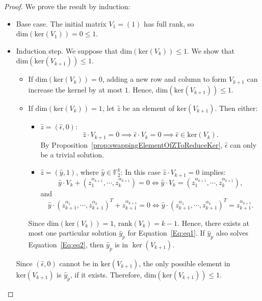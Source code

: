 \documentclass[11pt]{llncs}
\begin{document}
\begin{proof}
    We prove the result by induction:
    \begin{itemize}
        \item Base case. The initial matrix $V_1 = (1)$ has full rank, so $\text{dim}( \text{ker}(V_1)) = 0 \leq 1$.
        \item Induction step. We suppose that $\text{dim}( \text{ker}(V_k))\le 1$. We show that $\text{dim}( \text{ker}(V_{k+1}))\le 1$.
        \begin{itemize}
            \item If $\text{dim}( \text{ker}(V_k))= 0$, adding a new row and column to form $V_{k+1}$ can increase the kernel by at most $1$. Hence, $\text{dim}( \text{ker}(V_{k+1}))\le 1$.
            \item            
            If $\text{dim}( \text{ker}(V_k))= 1$, let $\hat{z}$ be an element of $\text{ker}\left(V_{k+1}\right)$. 
            Then either:
            \begin{itemize}
            	\item  \( \hat{z} = (\hat{\epsilon}, 0) \):  
\[
\hat{z} \cdot V_{k+1} = 0 \implies \hat{\epsilon} \cdot V_k = 0 \implies \hat{\epsilon} \in \text{ker}(V_k).
\]
By Proposition~\ref{prop:swappingElementOfZToReduceKer}, \( \hat{\epsilon} \) can only be a trivial solution.

\item \( \hat{z} = (\hat{y}, 1) \), where \( \hat{y} \in \mathbb{F}_2^k \):          
In this case $\hat{z} \cdot V_{k+1} = 0$ implies:
\begin{equation}\label{Eq:eq1}
 \hat{y}  \cdot V_{k} + (z_{1}^{\alpha_{k+1}}, \cdots, z_{k}^{\alpha_{k+1}}) = 0 \iff \hat{y} \cdot V_{k} = (z_{1}^{\alpha_{k+1}}, \cdots, z_{k}^{\alpha_{k+1}}),
\end{equation}
and 
\begin{equation}\label{Eq:eq2}
\hat{y} \cdot (z_{k+1}^{\alpha_1}, \cdots, z_{k+1}^{\alpha_k})^T + z_{k+1}^{\alpha_{k+1}} = 0 \iff \hat{y} \cdot (z_{k+1}^{\alpha_1}, \cdots, z_{k+1}^{\alpha_k})^T = z_{k+1}^{\alpha_{k+1}}.
\end{equation}	

        \end{itemize}
            
Since $\text{dim}(\text{ker}(V_k)) = 1$, $\text{rank}(V_k) = k-1$. Hence, there exists at most one particular solution $\hat{y}_p$ for Equation~\ref{Eq:eq1}. 
If \( \hat{y}_p \) also solves Equation~\ref{Eq:eq2}, then \( \hat{y}_p \) is in \( \ker(V_{k+1}) \).
 
\end{itemize}
Since $(\hat{\epsilon}, 0)$  cannot be in \( \text{ker}(V_{k+1}) \), the only possible element in \( \text{ker}(V_{k+1}) \) is \( \hat{y}_p \), if it exists. Therefore, \( \text{dim}(\text{ker}(V_{k+1})) \leq 1 \).
        \end{itemize}

\end{proof}
\end{document}
